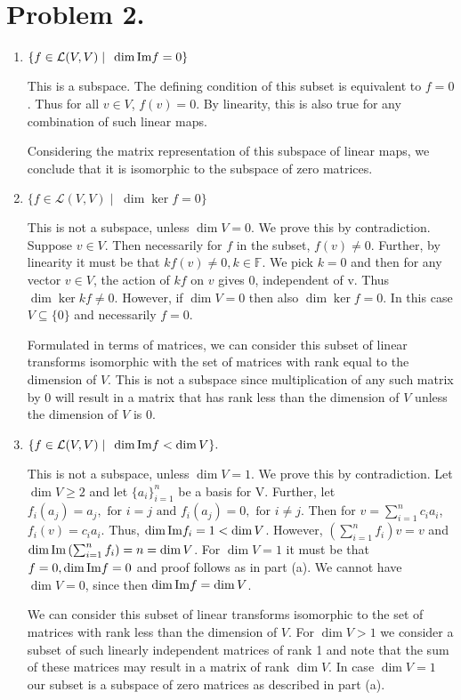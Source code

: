 \documentclass[11pt]{amsart}
\newcommand{\field}[1]{\mathbb{#1}}
\begin{document}
\section*{Problem 2.}
\begin{enumerate}
\item{ $\{f \in {\mathcal L}(V,V) \; | \;\; \dim {\rm Im}f =0\}$} 
  
  This is a subspace. The defining condition of this subset is
  equivalent to $f=0$. Thus for all $v\in V$, $f(v)=0$.  By linearity,
  this is also true for any combination of such linear maps.
  
  Considering the matrix representation of this subspace of linear
  maps, we conclude that it is isomorphic to the subspace of zero
  matrices.

\item{ $\{f \in {\mathcal L}(V,V) \; | \;\; \dim {\ker}f =0\}$ } 
  
  This is not a subspace, unless $\dim V=0$. We prove this by
  contradiction.  Suppose $v\in V.$ Then necessarily for $f$ in the
  subset, $f(v) \neq 0$.  Further, by linearity it must be that $kf(v)
  \neq 0, k\in \field{F}$. We pick $k=0$ and then for any vector $v
  \in V$, the action of $kf$ on $v$ gives $0$, independent of v. Thus
  $\dim \ker kf \neq 0$.  However, if $\dim V=0$ then also $\dim \ker
  f=0$. In this case $V\subseteq \{0\}$ and necessarily $f=0$.
 
  Formulated in terms of matrices, we can consider this subset of
  linear transforms isomorphic with the set of matrices with rank
  equal to the dimension of $V$. This is not a subspace since
  multiplication of any such matrix by $0$ will result in a matrix
  that has rank less than the dimension of $V$ unless the dimension of
  $V$ is $0$.
\item{ $\{f \in {\mathcal L}(V,V) \; | \;\; \dim {\rm Im}f < \dim
    V\}.$} 
  
  This is not a subspace, unless $\dim V=1$. We prove this by
  contradiction.  Let $\dim V \geq 2$ and let $\{a_i\}_{i=1}^n$ be a
  basis for V.  Further, let $f_i(a_j)=a_j, \textrm{ for } i=j
  \textrm{ and } f_i(a_j)=0, \textrm{ for } i \neq j$. Then for
  $v=\sum_{i=1}^n c_i a_i$, $f_i(v)=c_ia_i$. Thus, $\dim {\rm Im}f_i =
  1 < \dim V$.  However, $\left(\sum_{i=1}^n f_i\right)v=v$ and $\dim
  {\rm Im} \left(\sum_{i=1}^n f_i\right)=n=\dim V$. For $\dim V=1$ it
  must be that $f=0, \dim {\rm Im}f=0$ and proof follows as in part
  (a). We cannot have $\dim V=0$, since then $\dim {\rm Im}f = \dim V$.
  
  We can consider this subset of linear transforms isomorphic to the
  set of matrices with rank less than the dimension of $V$. For $\dim
  V>1$ we consider a subset of such linearly independent matrices of
  rank 1 and note that the sum of these matrices may result in a
  matrix of rank $\dim V$. In case $\dim V=1$ our subset is a subspace
  of zero matrices as described in part (a).
\end{enumerate}
\end{document}
